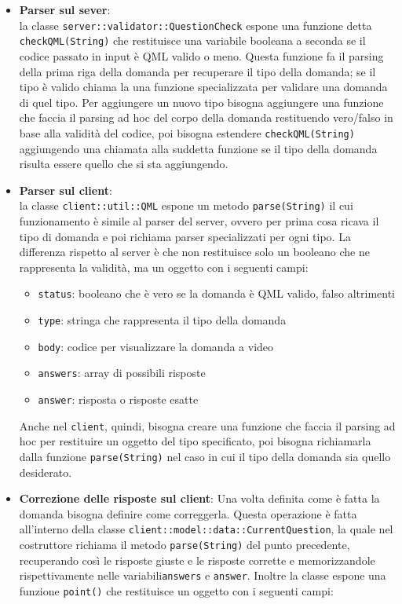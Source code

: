 \documentclass[12pt,a4paper]{article}
\begin{document}
	\begin{itemize}
	\item \textbf{Parser sul sever}:\\
	la classe \texttt{server::validator::QuestionCheck} espone una funzione detta \\ \texttt{checkQML(String)} che restituisce una variabile booleana a seconda se il codice passato in input è QML valido o meno.
	Questa funzione fa il parsing della prima riga della domanda per recuperare il tipo della domanda; se il tipo è valido chiama la una funzione specializzata per validare una domanda di quel tipo. Per aggiungere un nuovo tipo bisogna aggiungere una funzione che faccia il parsing ad hoc del corpo della domanda restituendo vero/falso in base alla validità del codice, poi bisogna estendere \texttt{checkQML(String)} aggiungendo una chiamata alla suddetta funzione se il tipo della domanda risulta essere quello che si sta aggiungendo.
	\item \textbf{Parser sul client}:\\
	la classe \texttt{client::util::QML} espone un metodo \texttt{parse(String)} il cui funzionamento è simile al parser del server, ovvero per prima cosa ricava il tipo di domanda e poi richiama parser specializzati per ogni tipo. La differenza rispetto al server è che non restituisce solo un booleano che ne rappresenta la validità, ma un oggetto  con i seguenti campi:
	\begin{itemize}
	\item \texttt{status}: booleano che è vero se la domanda è QML valido, falso altrimenti
	\item \texttt{type}: stringa che rappresenta il tipo della domanda
	\item \texttt{body}: codice  per visualizzare la domanda a video
	\item \texttt{answers}: array di possibili risposte
	\item \texttt{answer}: risposta o risposte esatte
	\end{itemize}
	Anche nel \texttt{client}, quindi, bisogna creare una funzione che faccia il parsing ad hoc per restituire un oggetto del tipo specificato, poi bisogna richiamarla dalla funzione \texttt{parse(String)} nel caso in cui il tipo della domanda sia quello desiderato.
	\item \textbf{Correzione delle risposte sul client}:
	Una volta definita come è fatta la domanda bisogna definire come correggerla. Questa operazione è fatta all’interno della classe \texttt{client::model::data::CurrentQuestion}, la quale nel costruttore richiama il metodo \texttt{parse(String)} del punto precedente, recuperando così le risposte giuste e le risposte corrette e memorizzandole rispettivamente nelle variabili\texttt{answers} e \texttt{answer}. Inoltre la classe espone una funzione \texttt{point()} che restituisce un oggetto  con i seguenti campi:

\end{itemize}
\end{document}
